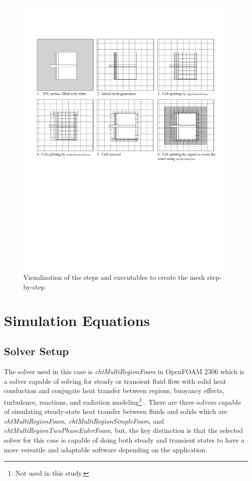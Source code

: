 \begin{figure}[htb]
     \centering
    \includegraphics[trim=1cm 11cm 1cm 3cm, clip, width=0.9\linewidth]{Figures/snappyhex.pdf}
     \caption[Mesh Creation Steps]{Visualization of the steps and executables to create the mesh step-by-step}
   \label{meshsteps}
 \end{figure}


\section{Simulation Equations}

\subsection{Solver Setup}
The solver used in this case is \textit{chtMultiRegionFoam} in OpenFOAM 2306 which is a solver capable of solving for steady or transient fluid flow with solid heat conduction and conjugate heat transfer between regions, buoyancy effects, turbulence, reactions, and radiation modeling\footnote{Not used in this study.} \cite{cht}.
There are three solvers capable of simulating steady-state heat transfer between fluids and solids which are \textit{chtMultiRegionFoam}, \textit{chtMultiRegionSimpleFoam}, and \textit{chtMultiRegionTwoPhaseEulerFoam}, but, the key distinction is that the selected solver for this case is capable of doing both steady and transient states to have a more versatile and adaptable software depending on the application. 


